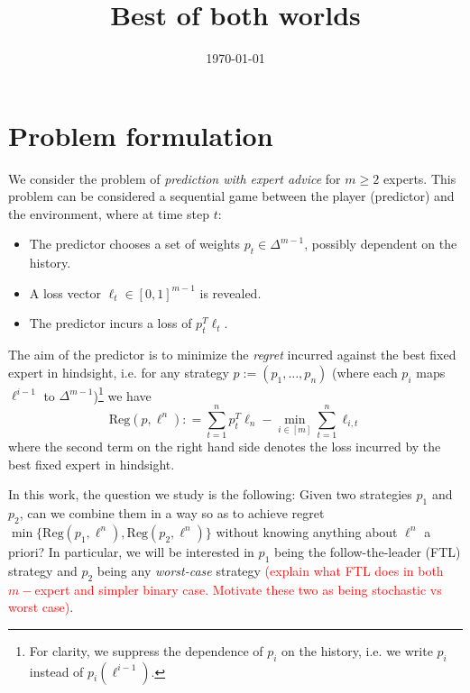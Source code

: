\documentclass[11pt,letter]{article}
\title{Best of both worlds}
\date{\today}
\newcommand{\defeq}{\mathrel{\mathop{:}}=}
\newcommand{\redt}{\textcolor{red}}
\newcommand{\Reg}{\mathrm{Reg}}
\begin{document}
\maketitle

\section{Problem formulation}
We consider the problem of \emph{prediction with expert advice} for $m \ge 2$ experts. This problem can be considered a sequential game between the player (predictor) and the environment, where at time step $t$: 
\begin{itemize}
    \item The predictor chooses a set of weights $p_t \in \Delta^{m-1}$, possibly dependent on the history. 
    \item A loss vector $\ell_t \in [0,1]^{m-1}$ is revealed.
    \item The predictor incurs a loss of $p_t^T \ell_t$.  
\end{itemize} 
The aim of the predictor is to minimize the \emph{regret} incurred against the best fixed expert in hindsight, i.e. for any strategy $p := (p_1,\dotsc,p_n)$ (where each $p_i$ maps $\ell^{i-1}$ to $\Delta^{m-1}$)\footnote{For clarity, we suppress the dependence of $p_i$ on the history, i.e. we write $p_i$ instead of $p_i(\ell^{i-1})$.} we have
\begin{equation}\label{eq:PWERegDefn}
    \Reg(p, \ell^n) \defeq \sum_{t=1}^n p_t^T \ell_n  - \min_{i\in [m]} \sum_{t=1}^n \ell_{i,t}
\end{equation}
where the second term on the right hand side denotes the loss incurred by the best fixed expert in hindsight. 

In this work, the question we study is the following: Given two strategies $p_1$ and $p_2$, can we combine them in a way so as to achieve regret $\min\{\Reg(p_1, \ell^n), \Reg(p_2, \ell^n)\}$ without knowing anything about $\ell^n$ a priori? In particular, we will be interested in $p_1$ being the follow-the-leader (FTL) strategy and $p_2$ being any \emph{worst-case} strategy \redt{(explain what FTL does in both $m-$expert and simpler binary case. Motivate these two as being stochastic vs worst case)}. 
\end{document}
